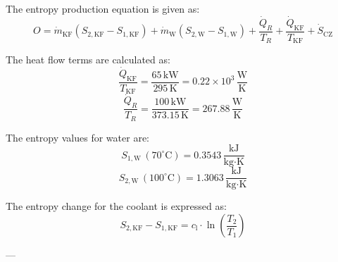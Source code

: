 The entropy production equation is given as:  
\[
O = \dot{m}_{\text{KF}} \left( S_{2,\text{KF}} - S_{1,\text{KF}} \right) + \dot{m}_{\text{W}} \left( S_{2,\text{W}} - S_{1,\text{W}} \right) + \frac{\dot{Q}_R}{T_R} + \frac{\dot{Q}_{\text{KF}}}{T_{\text{KF}}} + \dot{S}_{\text{CZ}}
\]  

The heat flow terms are calculated as:  
\[
\frac{\dot{Q}_{\text{KF}}}{T_{\text{KF}}} = \frac{65 \, \text{kW}}{295 \, \text{K}} = 0.22 \times 10^3 \, \frac{\text{W}}{\text{K}}
\]  
\[
\frac{\dot{Q}_R}{T_R} = \frac{100 \, \text{kW}}{373.15 \, \text{K}} = 267.88 \, \frac{\text{W}}{\text{K}}
\]  

The entropy values for water are:  
\[
S_{1,\text{W}} \, (70^\circ\text{C}) = 0.3543 \, \frac{\text{kJ}}{\text{kg·K}}
\]  
\[
S_{2,\text{W}} \, (100^\circ\text{C}) = 1.3063 \, \frac{\text{kJ}}{\text{kg·K}}
\]  

The entropy change for the coolant is expressed as:  
\[
S_{2,\text{KF}} - S_{1,\text{KF}} = c_{\text{l}} \cdot \ln \left( \frac{T_2}{T_1} \right)
\]  

---